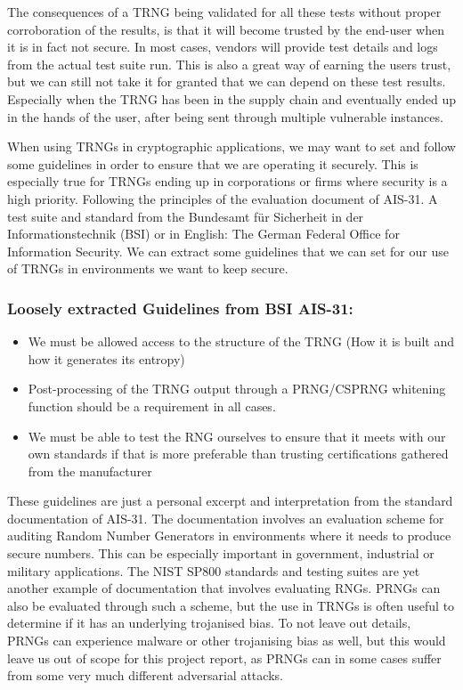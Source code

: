 \documentclass[]{final_report}
\begin{document}
\par{The consequences of a TRNG being validated for all these tests without proper corroboration of the results, is that it will become trusted by the end-user when it is in fact not secure. In most cases, vendors will provide test details and logs from the actual test suite run. This is also a great way of earning the users trust, but we can still not take it for granted that we can depend on these test results. Especially when the TRNG has been in the supply chain and eventually ended up in the hands of the user, after being sent through multiple vulnerable instances.}

\par{When using TRNGs in cryptographic applications, we may want to set and follow some guidelines in order to ensure that we are operating it securely. This is especially true for TRNGs ending up in corporations or firms where security is a high priority. Following the principles of the evaluation document of AIS-31\cite{BSI:2013}. A test suite and standard from the Bundesamt für Sicherheit in der Informationstechnik (BSI) or in English: The German Federal Office for Information Security. We can extract some guidelines that we can set for our use of TRNGs in environments we want to keep secure.}

\subsubsection*{Loosely extracted Guidelines from BSI AIS-31\cite{BSI:2013}:}
\begin{itemize}
    \item We must be allowed access to the structure of the TRNG (How it is built and how it generates its entropy)
    \item Post-processing of the TRNG output through a PRNG/CSPRNG whitening function should be a requirement in all cases.
    \item We must be able to test the RNG ourselves to ensure that it meets with our own standards if that is more preferable than trusting certifications gathered from the manufacturer
\end{itemize}

\par{These guidelines are just a personal excerpt and interpretation from the standard documentation of AIS-31. The documentation involves an evaluation scheme for auditing Random Number Generators in environments where it needs to produce secure numbers. This can be especially important in government, industrial or military applications. The NIST SP800 standards and testing suites are yet another example of documentation that involves evaluating RNGs. PRNGs can also be evaluated through such a scheme, but the use in TRNGs is often useful to determine if it has an underlying trojanised bias. To not leave out details, PRNGs can experience malware or other trojanising bias as well, but this would leave us out of scope for this project report, as PRNGs can in some cases suffer from some very much different adversarial attacks.\cite{Cornejo:2014}}
\end{document}
